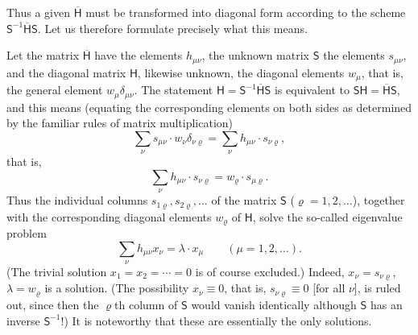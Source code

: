 \documentclass[fontsize=13pt,twoside,openany,headings=normal,parskip=false,bookmarkpackage=false,DIV=calc]{scrbook}
\begin{document}
Thus a given $\overline{\mathsf{H}}$ must be transformed into diagonal form according to the scheme $\mathsf{S}^{-1}\overline{\mathsf{H}}\mathsf{S}$. Let us therefore formulate precisely what this means.
\hypertarget{origpage-11}{}%

Let the matrix $\overline{\mathsf{H}}$ have the elements $h_{\mu\nu}$, the unknown matrix $\mathsf{S}$ the elements $s_{\mu\nu}$, and the diagonal matrix $\mathsf{H}$, likewise unknown, the diagonal elements $w_\mu$, that is, the general element $w_\mu\delta_{\mu\nu}$. The statement $\mathsf{H}=\mathsf{S}^{-1}\overline{\mathsf{H}}\mathsf{S}$ is equivalent to $\mathsf{S}\mathsf{H}=\overline{\mathsf{H}}\mathsf{S}$, and this means (equating the corresponding elements on both sides as determined by the familiar rules of matrix multiplication)
\[
 \sum_\nu s_{\mu\nu}\cdot w_\nu\delta_{\nu\varrho}
 =\sum_\nu h_{\mu\nu}\cdot s_{\nu\varrho},
\]
that is,
\[
 \sum_\nu h_{\mu\nu}\cdot s_{\nu\varrho}=w_\varrho\cdot s_{\mu\varrho}.
\]
Thus the individual columns $s_{1\varrho},s_{2\varrho},\ldots$ of the matrix $\mathsf{S}$ ($\varrho=1,2,\ldots$), together with the corresponding diagonal elements $w_\varrho$ of $\mathsf{H}$, solve the so-called eigenvalue problem
\[
 \sum_\nu h_{\mu\nu}x_\nu=\lambda\cdot x_\mu\qquad(\mu=1,2,\ldots).
\]
(The trivial solution $x_1=x_2=\cdots=0$ is of course excluded.) Indeed, $x_\nu=s_{\nu\varrho}$, $\lambda=w_\varrho$ is a solution. (The possibility $x_\nu\equiv0$, that is, $s_{\nu\varrho}\equiv0$ [for all $\nu$], is ruled out, since then the $\varrho$th column of $\mathsf{S}$ would vanish identically although $\mathsf{S}$ has an inverse $\mathsf{S}^{-1}$!) It is noteworthy that these are essentially the only solutions.
\end{document}
